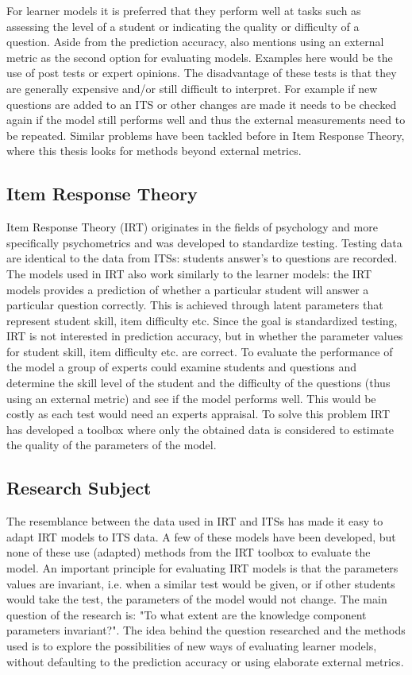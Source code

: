 \documentclass{scrartcl}
\begin{document}
For learner models it is preferred that they perform well at tasks such as assessing the level of a student or indicating the quality or difficulty of a question. Aside from the prediction accuracy, \cite{modelreview} also mentions using an external metric as the second option for evaluating models. Examples here would be the use of post tests or expert opinions. The disadvantage of these tests is that they are generally expensive and/or still difficult to interpret. For example if new questions are added to an ITS or other changes are made it needs to be checked again if the model still performs well and thus the external measurements need to be repeated. Similar problems have been tackled before in Item Response Theory, where this thesis looks for methods beyond external metrics.

\subsection{Item Response Theory}
Item Response Theory (IRT) originates in the fields of psychology and more specifically psychometrics and was developed to standardize testing. Testing data are identical to the data from ITSs: students answer's to questions are recorded. The models used in IRT also work similarly to the learner models: the IRT models provides a prediction of whether a particular student will answer a particular question correctly. This is achieved through latent parameters that represent student skill, item difficulty etc. Since the goal is standardized testing, IRT is not interested in prediction accuracy, but in whether the parameter values for student skill, item difficulty etc. are correct. To evaluate the performance of the model a group of experts could examine students and questions and determine the skill level of the student and the difficulty of the questions (thus using an external metric) and see if the model performs well. This would be costly as each test would need an experts appraisal. To solve this problem IRT has developed a toolbox where only the obtained data is considered to estimate the quality of the parameters of the model.  

\subsection{Research Subject}
The resemblance between the data used in IRT and ITSs has made it easy to adapt IRT models to ITS data. A few of these models have been developed, but none of these use (adapted) methods from the IRT toolbox to evaluate the model. An important principle for evaluating IRT models is that the parameters values are invariant, i.e. when a similar test would be given, or if other students would take the test, the parameters of the model would not change. The main question of the research is: "To what extent are the knowledge component parameters invariant?". The idea behind the question researched and the methods used is to explore the possibilities of new ways of evaluating learner models, without defaulting to the prediction accuracy or using elaborate external metrics.
\end{document}
